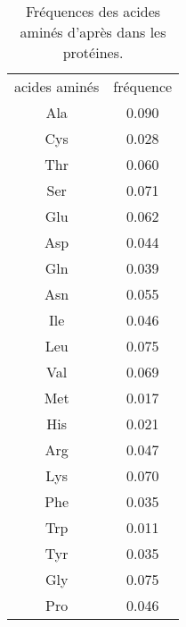     \begin{table}[!htbp]
      \centering

      \begin{tabular}{cc}

        \toprule
        acides aminés & fréquence \\
        \cmidrule{1-2}

        Ala &   0.090 \\      
        Cys &   0.028 \\  
        Thr &   0.060 \\  
        Ser &   0.071 \\  
        Glu &   0.062 \\  
        Asp &   0.044 \\  
        Gln &   0.039 \\  
        Asn &   0.055 \\  
        Ile &   0.046 \\  
        Leu &   0.075 \\  
        Val &   0.069 \\  
        Met &   0.017 \\  
        His &   0.021 \\  
        Arg &   0.047 \\  
        Lys &   0.070 \\  
        Phe &   0.035 \\  
        Trp &   0.011 \\  
        Tyr &   0.035 \\  
        Gly &   0.075 \\  
        Pro &   0.046 \\      
        \bottomrule


      \end{tabular}      
      \caption{Fréquences des acides aminés d'après dans les  protéines.}
\label{tab:AA_groupes}      
    \end{table}


